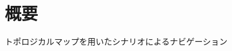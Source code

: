 \documentclass[../main]{subfiles}
\begin{document}
 \chapter*{概要}
    {\LARGE トポロジカルマップを用いたシナリオによるナビゲーション}\\
\end{document}

